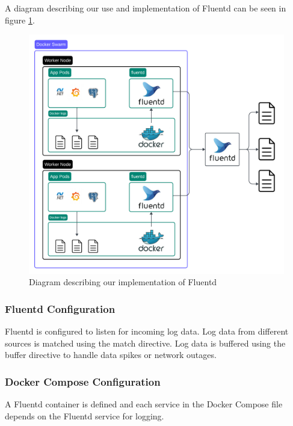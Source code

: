 A diagram describing our use and implementation of Fluentd can be seen in figure \ref{fig:logging2}.
\begin{figure}[H]
	\centering
	\includegraphics[width=1\textwidth]{Logging2.png}
	\caption{Diagram describing our implementation of Fluentd}
	\label{fig:logging2}
\end{figure}

\subsubsection*{Fluentd Configuration}

Fluentd is configured to listen for incoming log data.%
Log data from different sources is matched using the match directive.%
Log data is buffered using the buffer directive to handle data spikes or network outages.%

\subsubsection*{Docker Compose Configuration}

A Fluentd container is defined %
and each service in the Docker Compose file depends on the Fluentd service for logging.

